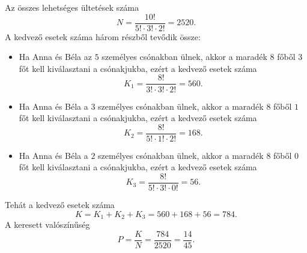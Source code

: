 \begin{solution}
Az összes lehetséges ültetések száma 
\[
N=\frac{10!}{5!\cdot3!\cdot2!}=2520.
\]
A kedvező esetek száma három részből tevődik össze: 
\begin{itemize}
\item Ha Anna és Béla az $5$ személyes csónakban ülnek, akkor a maradék
$8$ főből $3$ főt kell kiválasztani a csónakjukba, ezért a kedvező
esetek száma 
\[
K_{1}=\frac{8!}{3!\cdot3!\cdot2!}=560.
\]
\item Ha Anna és Béla a $3$ személyes csónakban ülnek, akkor a maradék
$8$ főből $1$ főt kell kiválasztani a csónakjukba, ezért a kedvező
esetek száma 
\[
K_{2}=\frac{8!}{5!\cdot1!\cdot2!}=168.
\]
\item Ha Anna és Béla a $2$ személyes csónakban ülnek, akkor a maradék
$8$ főből $0$ főt kell kiválasztani a csónakjukba, ezért a kedvező
esetek száma 
\[
K_{3}=\frac{8!}{5!\cdot3!\cdot0!}=56.
\]
\end{itemize}
Tehát a kedvező esetek száma 
\[
K=K_{1}+K_{2}+K_{3}=560+168+56=784.
\]
A keresett valószínűség 
\[
P=\frac{K}{N}=\frac{784}{2520}=\frac{14}{45}.
\]
\end{solution}

